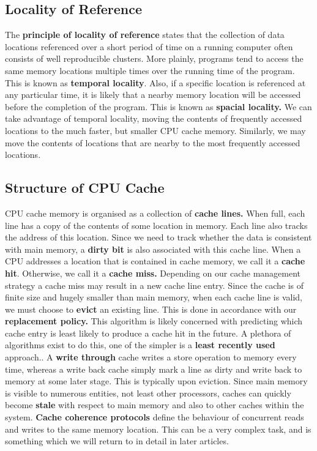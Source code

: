 \documentclass[10pt,a4paper]{article}
\begin{document}
\subsection{Locality of Reference}
The \textbf{principle of locality of reference} states that the collection of data locations referenced over a short period of time on a running computer often consists of well reproducible clusters.  More plainly, programs tend to access the same memory locations multiple times over the running time of the program. This is known as \textbf{temporal locality}. Also, if a specific location is referenced at any particular time, it is likely that a nearby memory location will be accessed before the completion of the program. This is known as \textbf{spacial locality.} We can take advantage of temporal locality, moving the contents of frequently accessed locations to the much faster, but smaller CPU cache memory. Similarly, we may move the contents of locations that are nearby to the most frequently accessed locations. 
\subsection{Structure of CPU Cache}
CPU cache memory is organised as a collection of \textbf{cache lines.} When full, each line has a copy of the contents of some location in memory. Each line also tracks the address of this location. Since we need to track whether the data is consistent with main memory, a \textbf{dirty bit} is also associated with this cache line. When a CPU addresses a location that is contained in cache memory, we call it a \textbf{cache hit}. Otherwise, we call it a \textbf{cache miss.} Depending on our cache management strategy a cache miss may result in a new cache line entry. Since the cache is of finite size and hugely smaller than main  memory, when each cache line is valid, we must choose to \textbf{evict} an existing line. This is done in accordance with our \textbf{replacement policy.}
\newline\newline
This algorithm is likely concerned with predicting which cache entry is least likely to produce a cache hit in the future. A plethora of algorithms exist to do this, one of the simpler is a \textbf{least recently used} approach.\cite{LRUCITE}. A \textbf{write through} cache writes a store operation to memory every time, whereas a write back cache simply mark a line as dirty and write back to memory at some later stage. This is typically upon eviction. Since main memory is visible to numerous entities, not least other processors, caches can quickly become \textbf{stale} with respect to main memory and also to other caches within the system. \textbf{Cache coherence protocols} \cite{COHERENCY} define the behaviour of concurrent reads and writes to the same memory location. This can be a very complex task, and is something which we will return to in detail in later articles. 
\end{document}
